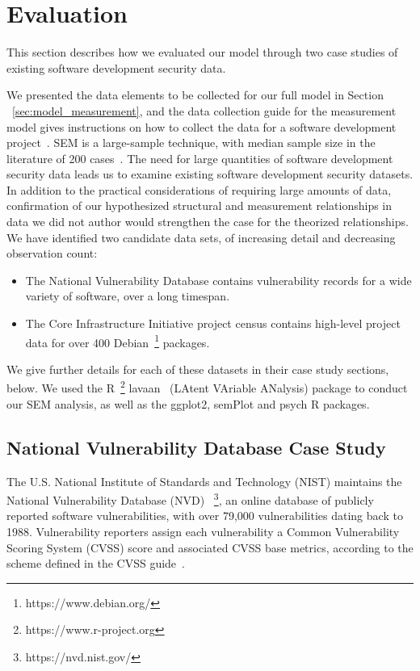 \section{Evaluation}
\label{sec:evaluation}

This section describes how we evaluated our model through two case studies of existing software development security data.

We presented the data elements to be collected for our full model in Section ~\ref{sec:model_measurement}, and the data collection guide for the measurement model gives instructions on how to collect the data for a software development project~\cite{morrison2016spefsite}.  SEM is a large-sample technique, with median sample size in the literature of 200 cases~\cite{kline2015principles}. The need for large quantities of software development security data leads us to examine existing software development security datasets. In addition to the practical considerations of requiring large amounts of data, confirmation of our hypothesized structural and measurement relationships in data we did not author would strengthen the case for the theorized relationships.
We have identified two candidate data sets, of increasing detail and decreasing observation count: 
\begin{itemize}
\item The National Vulnerability Database contains vulnerability records for a wide variety of software, over a long timespan.
\item The Core Infrastructure Initiative project census contains high-level project data for over 400 Debian~\footnote{https://www.debian.org/} packages.
\end{itemize}

We give further details for each of these datasets in their case study sections, below. We used the R~\footnote{https://www.r-project.org}  lavaan~\cite{roseel2012lavaan} (LAtent VAriable ANalysis) package to conduct our SEM analysis, as well as the ggplot2, semPlot and psych R packages.

\subsection{National Vulnerability Database Case Study}
\label{sec:evaluation_nvd}
The U.S. National Institute of Standards and Technology (NIST) maintains the National Vulnerability Database (NVD) ~\footnote{https://nvd.nist.gov/}, an online database of publicly reported software vulnerabilities, with over 79,000 vulnerabilities dating back to 1988. Vulnerability reporters assign each vulnerability a Common Vulnerability Scoring System (CVSS) score and associated CVSS base metrics, according to the scheme defined in the CVSS guide~\cite{mell2007complete}.  

